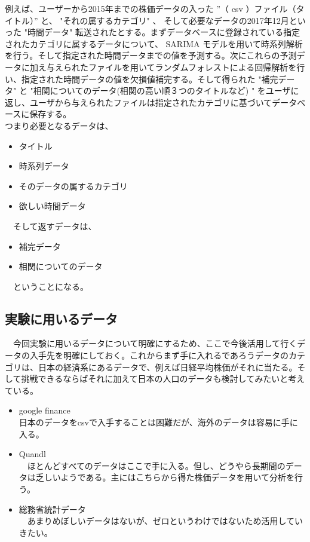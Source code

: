 \documentclass{scrartcl}
\begin{document}
例えば、ユーザーから2015年までの株価データの入った ”（ csv ）ファイル（タイトル）” と、 "それの属するカテゴリ" 、 そして必要なデータの2017年12月といった "時間データ" 転送されたとする。まずデータベースに登録されている指定されたカテゴリに属するデータについて、 SARIMA モデルを用いて時系列解析を行う。そして指定された時間データまでの値を予測する。次にこれらの予測データに加え与えられたファイルを用いてランダムフォレストによる回帰解析を行い、指定された時間データの値を欠損値補完する。そして得られた "補完データ" と "相関についてのデータ(相関の高い順３つのタイトルなど) " をユーザに返し、ユーザから与えられたファイルは指定されたカテゴリに基づいてデータベースに保存する。\\

つまり必要となるデータは、\\
\begin{itemize}
\item タイトル\\
\item 時系列データ\\
\item そのデータの属するカテゴリ\\
\item 欲しい時間データ\\
\end{itemize}

　そして返すデータは、\\
\begin{itemize}
\item 補完データ\\
\item 相関についてのデータ\\
\end{itemize}

　ということになる。\\

\subsection{実験に用いるデータ}
\label{sec:orga6354a5}
　今回実験に用いるデータについて明確にするため、ここで今後活用して行くデータの入手先を明確にしておく。これからまず手に入れるであろうデータのカテゴリは、日本の経済系にあるデータで、例えば日経平均株価がそれに当たる。そして挑戦できるならばそれに加えて日本の人口のデータも検討してみたいと考えている。\\
\begin{itemize}
\item google finance\\
日本のデータをcsvで入手することは困難だが、海外のデータは容易に手に入る。\\
\item Quandl\\
　ほとんどすべてのデータはここで手に入る。但し、どうやら長期間のデータは乏しいようである。主にはこちらから得た株価データを用いて分析を行う。\\
\item 総務省統計データ\\
　あまりめぼしいデータはないが、ゼロというわけではないため活用していきたい。\\
\end{itemize}
\end{document}
